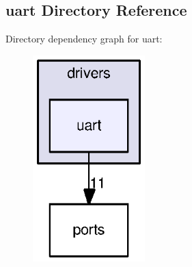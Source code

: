 \subsection{uart Directory Reference}
\label{dir_58d9b6b9b6c44ee981befb907bf69e99}
Directory dependency graph for uart\+:
\nopagebreak
\begin{figure}[H]
\begin{center}
\leavevmode
\includegraphics[width=123pt]{dir_58d9b6b9b6c44ee981befb907bf69e99_dep}
\end{center}
\end{figure}
